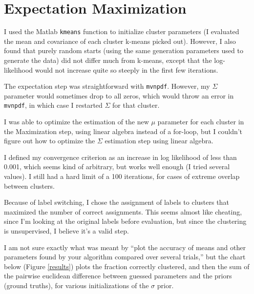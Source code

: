 \documentclass[11pt]{report}
\begin{document}
\section*{Expectation Maximization}

I used the Matlab \texttt{kmeans} function to initialize cluster parameters (I evaluated the mean and covariance of each cluster k-means picked out). However, I also found that purely random starts (using the same generation parameters used to generate the data) did not differ much from k-means, except that the log-likelihood would not increase quite so steeply in the first few iterations.

The expectation step was straightforward with \texttt{mvnpdf}. However, my $\Sigma$ parameter would sometimes drop to all zeros, which would throw an error in \texttt{mvnpdf}, in which case I restarted $\Sigma$ for that cluster.

I was able to optimize the estimation of the new $\mu$ parameter for each cluster in the Maximization step, using linear algebra instead of a for-loop, but I couldn't figure out how to optimize the $\Sigma$ estimation step using linear algebra.

I defined my convergence criterion as an increase in log likelihood of less than 0.001, which seems kind of arbitrary, but works well enough (I tried several values). I still had a hard limit of a 100 iterations, for cases of extreme overlap between clusters.

Because of label switching, I chose the assignment of labels to clusters that maximized the number of correct assignments. This seems almost like cheating, since I'm looking at the original labels before evaluation, but since the clustering is unsupervised, I believe it's a valid step.


I am not sure exactly what was meant by ``plot the accuracy of means and other parameters found by your algorithm compared over several trials,'' but the chart below (Figure \ref{results}) plots the fraction correctly clustered, and then the sum of the pairwise euclidean difference between guessed parameters and the priors (ground truths), for various initializations of the $\sigma$ prior. 
\end{document}
